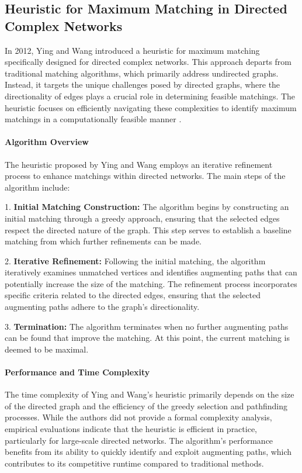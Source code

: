 \subsection*{Heuristic for Maximum Matching in Directed Complex Networks}

In 2012, Ying and Wang introduced a heuristic for maximum matching specifically designed for directed complex networks. This approach departs from traditional matching algorithms, which primarily address undirected graphs. Instead, it targets the unique challenges posed by directed graphs, where the directionality of edges plays a crucial role in determining feasible matchings. The heuristic focuses on efficiently navigating these complexities to identify maximum matchings in a computationally feasible manner \cite{ying2012heuristic}.

\paragraph{Algorithm Overview}
The heuristic proposed by Ying and Wang employs an iterative refinement process to enhance matchings within directed networks. The main steps of the algorithm include:

1. \textbf{Initial Matching Construction:} The algorithm begins by constructing an initial matching through a greedy approach, ensuring that the selected edges respect the directed nature of the graph. This step serves to establish a baseline matching from which further refinements can be made.

2. \textbf{Iterative Refinement:} Following the initial matching, the algorithm iteratively examines unmatched vertices and identifies augmenting paths that can potentially increase the size of the matching. The refinement process incorporates specific criteria related to the directed edges, ensuring that the selected augmenting paths adhere to the graph's directionality.

3. \textbf{Termination:} The algorithm terminates when no further augmenting paths can be found that improve the matching. At this point, the current matching is deemed to be maximal.

\paragraph{Performance and Time Complexity}
The time complexity of Ying and Wang's heuristic primarily depends on the size of the directed graph and the efficiency of the greedy selection and pathfinding processes. While the authors did not provide a formal complexity analysis, empirical evaluations indicate that the heuristic is efficient in practice, particularly for large-scale directed networks. The algorithm's performance benefits from its ability to quickly identify and exploit augmenting paths, which contributes to its competitive runtime compared to traditional methods.

